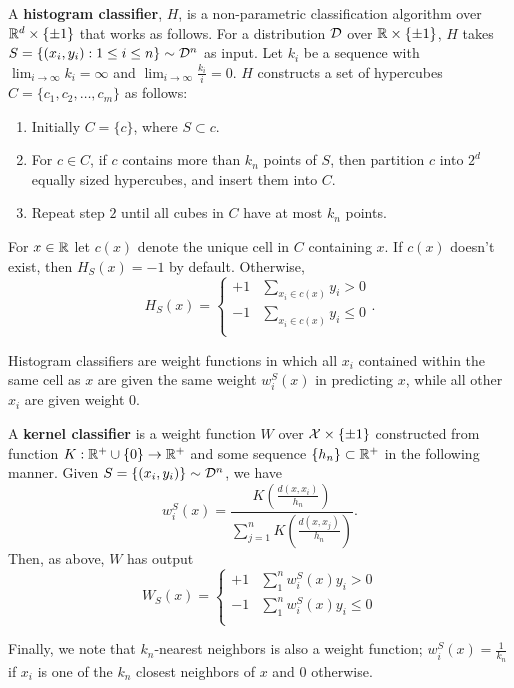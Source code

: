 \begin{defn}
A \textbf{histogram classifier}, $H$, is a non-parametric classification algorithm over $\mathbb R^d \times \{\pm 1\}$ that works as follows. For a distribution ${\mathcal D}$ over $\mathbb R \times \{\pm 1\}$, $H$ takes $S = \{(x_i, y_i): 1 \leq i \leq n\} \sim {\mathcal D}^n$ as input. Let $k_i$ be a sequence with $\lim_{i \to \infty} k_i = \infty$ and $\lim_{i \to \infty} \frac{k_i}{i} = 0$. $H$ constructs a set of hypercubes $C = \{c_1, c_2, \dots, c_m\}$ as follows:
\begin{enumerate}
	\item Initially $C = \{c\}$, where $S \subset c$.
	\item For $c \in C$, if $c$ contains more than $k_n$ points of $S$, then partition $c$ into $2^d$ equally sized hypercubes, and insert them into $C$.
	\item Repeat step $2$ until all cubes in $C$ have at most $k_n$ points. 
\end{enumerate}
For $x \in \mathbb R$ let $c(x)$ denote the unique cell in $C$ containing $x$. If $c(x)$ doesn't exist, then $H_S(x) = -1$ by default. Otherwise, \[ H_S(x) = \begin{cases} 
      +1 & \sum_{x_i \in c(x)} y_i > 0 \\
      -1 & \sum_{x_i \in c(x)}y_i \leq 0 \\
   \end{cases}.
\]
\end{defn}

Histogram classifiers are weight functions in which all $x_i$ contained within the same cell as $x$ are given the same weight $w_i^S(x)$ in predicting $x$, while all other $x_i$ are given weight $0$. 

\begin{defn}
A \textbf{kernel classifier} is a weight function $W$ over $\mathcal X \times \{\pm 1\}$ constructed from function $K: \mathbb R^+ \cup \{0\} \to \mathbb R^+$ and some sequence $\{h_n\} \subset \mathbb R^+$ in the following manner. Given $S = \{(x_i, y_i)\} \sim {\mathcal D}^n$, we have $$w_i^S(x) = \frac{K(\frac{d(x, x_i)}{h_n})}{\sum_{j = 1}^n K(\frac{d(x, x_j)}{h_n})}.$$ Then, as above, $W$ has output \[ W_S(x) = \begin{cases} 
      +1 & \sum_1^n w_i^S(x)y_i > 0 \\
      -1 & \sum_1^n w_i^S(x)y_i \leq 0 \\
   \end{cases}
\]
\end{defn}

Finally, we note that $k_n$-nearest neighbors is also a weight function; $w_i^S(x) = \frac{1}{k_n}$ if $x_i$ is one of the $k_n$ closest neighbors of $x$ and $0$ otherwise.

